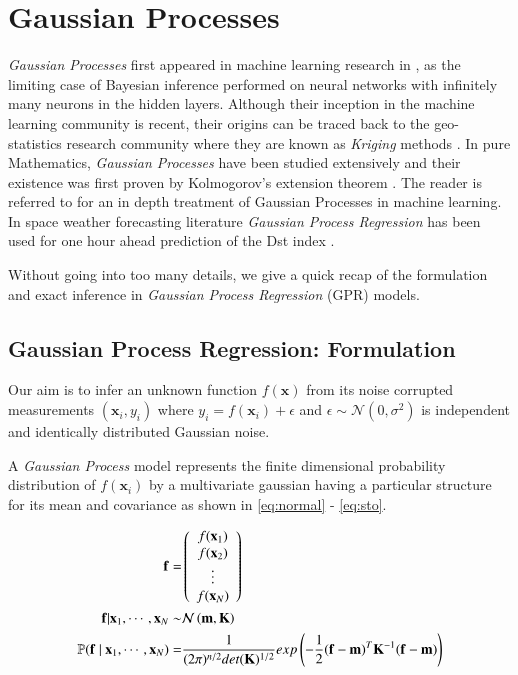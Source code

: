 \documentclass{article}
\begin{document}
\section{Gaussian Processes}

\emph{Gaussian Processes} first appeared in machine learning research
in \citet{Neal:1996:BLN:525544}, as the limiting case of Bayesian
inference performed on neural networks with infinitely many neurons in
the hidden layers. Although their inception in the machine learning
community is recent, their origins can be traced back to the
geo-statistics research community where they are known as
\emph{Kriging} methods \citep{krige1951statistical}. In pure
Mathematics, \emph{Gaussian Processes} have been studied extensively
and their existence was first proven by Kolmogorov's extension theorem
\citep{tao2011introduction}. The reader is referred to
\citet{Rasmussen:2005:GPM:1162254} for an in depth treatment of
Gaussian Processes in machine learning. In space weather forecasting
literature \emph{Gaussian Process Regression} has been used for one
hour ahead prediction of the Dst index \citep{SWE:SWE20479}.

Without going into too many details, we give a quick recap of the
formulation and exact inference in \emph{Gaussian Process Regression} (GPR) models. 

\subsection{Gaussian Process Regression: Formulation}

Our aim is to infer an unknown function $f(\mathbf{x})$ from its noise
corrupted measurements $(\mathbf{x}_i, y_i)$ where $y_i =
f(\mathbf{x}_i) + \epsilon$ and $\epsilon \sim \mathcal{N}(0,
\sigma^2)$ is independent and identically distributed Gaussian noise.

A \emph{Gaussian Process} model represents the finite dimensional
probability distribution of $f(\mathbf{x}_i)$ by a multivariate
gaussian having a particular structure for its mean and covariance as
shown in \ref{eq:normal} - \ref{eq:sto}.

\begin{align}
  \mathbf{f} = & \left( \begin{array}{c} f(\mathbf{x}_1) \\ f(\mathbf{x}_2) \\ \vdots \\ f(\mathbf{x}_N) \end{array} \right) \label{eq:fvalues}\\
  \vspace{2\baselineskip}
  \mathbf{f} | \mathbf{x}_1, \cdots, \mathbf{x}_N \sim & \mathcal{N}\left( \mathbf{m}, \mathbf{K} \right)  \label{eq:normal}\\
  \vspace{2\baselineskip}
  \mathbb{P}( \mathbf{f} \ | \ \mathbf{x}_1, \cdots, \mathbf{x}_N) = & \frac{1}{(2\pi)^{n/2} det(\mathbf{K})^{1/2}} exp \left(-\frac{1}{2} (\mathbf{f} - \mathbf{m})^T \mathbf{K}^{-1} (\mathbf{f} - \mathbf{m}) \right) \label{eq:sto}
\end{align}
\end{document}

